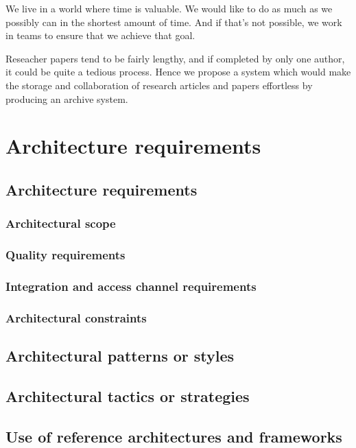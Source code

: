 \documentclass[11pt]{article}
\begin{document}
	We live in a world where time is valuable. We would like to do as much as we possibly can in the shortest amount of time. And if that's not possible, we work in teams to ensure that we achieve that goal.
	
	Reseacher papers tend to be fairly lengthy, and if completed by only one author, it could be quite a tedious process. Hence we propose a system which would make the storage and collaboration of research articles and papers effortless by producing an archive system.

	\newpage
	
	\section{Architecture requirements}
	
	\subsection{Architecture requirements}
	
	\subsubsection{Architectural scope}
	
	\subsubsection{Quality requirements}
	
	\subsubsection{Integration and access channel requirements}
	
	\subsubsection{Architectural constraints}
	
	\subsection{Architectural patterns or styles}
	
	\subsection{Architectural tactics or strategies}
	
	\subsection{Use of reference architectures and frameworks}
	
\end{document}
